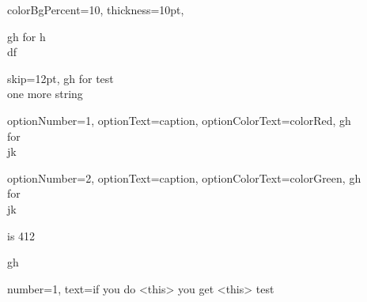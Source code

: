 \documentclass[12pt]{article}
\begin{document}
\begin{Example}{
    colorBgPercent=10,
    thickness=10pt,
}


    gh for h\\df

    \begin{ExampleTask}{
        skip=12pt,
    }
        gh for test\\
        one more string
    \end{ExampleTask}

    \begin{ExampleTask}{
        optionNumber=1,
        optionText=caption,
        optionColorText=colorRed,
    }
        gh\\
        for\\
        jk
    \end{ExampleTask}

    \begin{ExampleTask}{
        optionNumber=2,
        optionText=caption,
        optionColorText=colorGreen,
    }
        gh\\
        for\\
        jk
    \end{ExampleTask}


    \begin{ExampleAnswer}{}
        is 412
    \end{ExampleAnswer}

\end{Example}


\newpage

\begin{Corollaries}{}

    gh

    \begin{CorollariesItem}{
        number=1,
        text=if you do <this> you get <this>
    }
        test
    \end{CorollariesItem}

\end{Corollaries}
\end{document}
